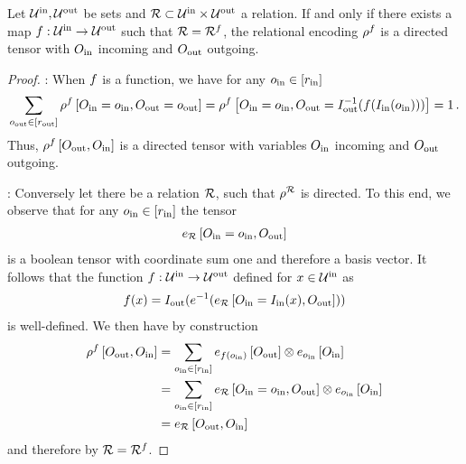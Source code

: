 \begin{theorem}\label{the:rencodingDirected}
	Let $\mathcal{U}^{\mathrm{in}},\mathcal{U}^{\mathrm{out}}$ be sets and $\mathcal{R}\subset\mathcal{U}^{\mathrm{in}}\times\mathcal{U}^{\mathrm{out}}$ a relation.
	If and only if there exists a map $f:\mathcal{U}^{\mathrm{in}}\rightarrow\mathcal{U}^{\mathrm{out}}$ such that $\mathcal{R}=\mathcal{R}^{f}$, the relational encoding $\rho^{f}$ is a directed tensor with $O_{\mathrm{in}}$ incoming and $O_{\mathrm{out}}$ outgoing.
\end{theorem}
\begin{proof}
	\proofrightsymbol:
	When $f$ is a function, we have for any $o_{\mathrm{in}}\in[r_{\mathrm{in}}]$
	\begin{align*}
		\sum_{o_{\mathrm{out}}\in[r_{\mathrm{out}}]} \rho^{f}\left[O_{\mathrm{in}}=o_{\mathrm{in}},O_{\mathrm{out}}=o_{\mathrm{out}}\right]
		=  \rho^{f}\left[O_{\mathrm{in}}=o_{\mathrm{in}},O_{\mathrm{out}}=I_{\mathrm{out}}^{-1}(f(I_{\mathrm{in}}(o_{\mathrm{in}})))\right]
		= 1 \, .
	\end{align*}
	Thus, $\rho^{f}\left[O_{\mathrm{out}},O_{\mathrm{in}}\right]$ is a directed tensor with variables $O_{\mathrm{in}}$ incoming and $O_{\mathrm{out}}$ outgoing.

	\proofleftsymbol:
	Conversely let there be a relation $\mathcal{R}$, such that $\rho^{\mathcal{R}}$ is directed.
	To this end, we observe that for any $o_{\mathrm{in}}\in[r_{\mathrm{in}}]$ the tensor
	\begin{align*}
		e_{\mathcal{R}}\left[O_{\mathrm{in}}=o_{\mathrm{in}},O_{\mathrm{out}}\right]
	\end{align*}
	is a boolean tensor with coordinate sum one and therefore a basis vector.
	It follows that the function $f : \mathcal{U}^{\mathrm{in}} \rightarrow \mathcal{U}^{\mathrm{out}} $ defined for $x\in\mathcal{U}^{\mathrm{in}}$ as
	\begin{align*}
		f(x)
		= I_{\mathrm{out}}(e^{-1}(e_{\mathcal{R}}\left[O_{\mathrm{in}}=I_{\mathrm{in}}(x),O_{\mathrm{out}}\right]))
	\end{align*}
	is well-defined.
	We then have by construction
	\begin{align*}
		\rho^{f}\left[O_{\mathrm{out}},O_{\mathrm{in}}\right]
		& = \sum_{o_{\mathrm{in}}\in[r_{\mathrm{in}}]}
		e_{f(o_{\mathrm{in}})}\left[O_{\mathrm{out}}\right] \otimes
		e_{o_{\mathrm{in}}}\left[O_{\mathrm{in}}\right] \\
		& =  \sum_{o_{\mathrm{in}}\in[r_{\mathrm{in}}]} e_{\mathcal{R}}\left[O_{\mathrm{in}}=o_{\mathrm{in}},O_{\mathrm{out}}\right] \otimes
		e_{o_{\mathrm{in}}}\left[O_{\mathrm{in}}\right] \\
		& = e_{\mathcal{R}}\left[O_{\mathrm{out}},O_{\mathrm{in}}\right]
	\end{align*}
	and therefore by  $\mathcal{R}=\mathcal{R}^{f}$.
\end{proof}

